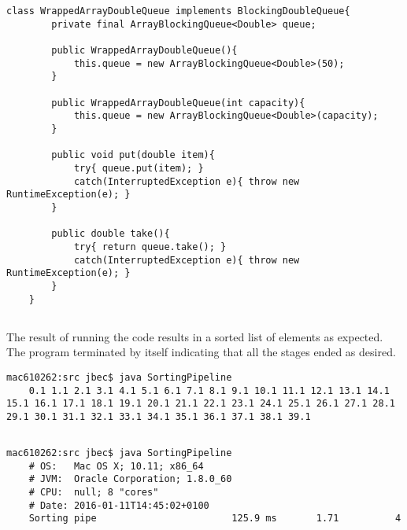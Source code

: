 \documentclass{ituhandin}
\begin{document}
\chapter{} %
\section{} %
\begin{lstlisting}[caption=Implemented code for wrapping \texttt{ArrayBlockingQueue}]
    class WrappedArrayDoubleQueue implements BlockingDoubleQueue{
        private final ArrayBlockingQueue<Double> queue;

        public WrappedArrayDoubleQueue(){
            this.queue = new ArrayBlockingQueue<Double>(50);
        }

        public WrappedArrayDoubleQueue(int capacity){
            this.queue = new ArrayBlockingQueue<Double>(capacity);
        }

        public void put(double item){
            try{ queue.put(item); }
            catch(InterruptedException e){ throw new RuntimeException(e); }
        }

        public double take(){
            try{ return queue.take(); }
            catch(InterruptedException e){ throw new RuntimeException(e); }
        }
    }
\end{lstlisting}
\section{} %
The result of running the code results in a sorted list of elements as expected. The program terminated by itself indicating that all the stages ended as desired.
\begin{lstlisting}[language={},frame={}]
    mac610262:src jbec$ java SortingPipeline
    0.1 1.1 2.1 3.1 4.1 5.1 6.1 7.1 8.1 9.1 10.1 11.1 12.1 13.1 14.1 15.1 16.1 17.1 18.1 19.1 20.1 21.1 22.1 23.1 24.1 25.1 26.1 27.1 28.1 29.1 30.1 31.1 32.1 33.1 34.1 35.1 36.1 37.1 38.1 39.1
\end{lstlisting}
\section{}\label{sec:sortingpipelinetests}


\begin{lstlisting}[language={},frame={}]
    mac610262:src jbec$ java SortingPipeline
    # OS:   Mac OS X; 10.11; x86_64
    # JVM:  Oracle Corporation; 1.8.0_60
    # CPU:  null; 8 "cores"
    # Date: 2016-01-11T14:45:02+0100
    Sorting pipe                        125.9 ms       1.71          4
\end{lstlisting}
\end{document}
